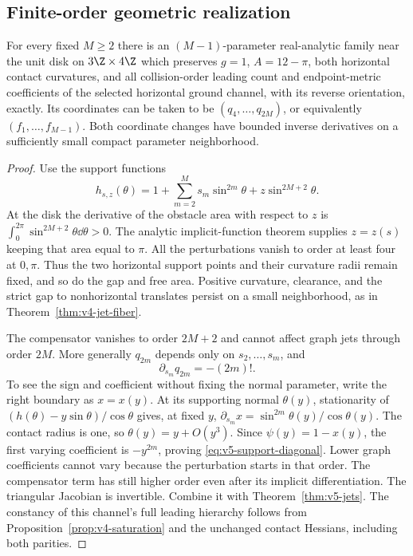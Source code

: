 \subsection{Finite-order geometric realization}
\begin{theorem}
\label{thm:v5-realization}
For every fixed $M\ge2$ there is an $(M-1)$-parameter real-analytic
family near the unit disk on $3\Z\times4\Z$ which preserves
$g=1$, $A=12-\pi$, both horizontal contact curvatures, and all collision-order leading
count and endpoint-metric coefficients of the selected horizontal ground
channel, with its reverse orientation, exactly. Its coordinates can be
taken to be $(q_4,\ldots,q_{2M})$, or equivalently
$(f_1,\ldots,f_{M-1})$. Both coordinate changes have bounded inverse
derivatives on a sufficiently small compact parameter neighborhood.
\end{theorem}
\begin{proof}
Use the support functions
\[
 h_{s,z}(\theta)=1+\sum_{m=2}^M s_m\sin^{2m}\theta
                         +z\sin^{2M+2}\theta.
\]
At the disk the derivative of the obstacle area with respect to $z$ is
$\int_0^{2\pi}\sin^{2M+2}\theta\dd\theta>0$. The analytic implicit-function
theorem supplies $z=z(s)$ keeping that area equal to $\pi$. All the
perturbations vanish to order at least four at $0,\pi$. Thus the two
horizontal support points and their curvature radii remain fixed, and
so do the gap and free area. Positive curvature, clearance, and the
strict gap to nonhorizontal translates persist on a small neighborhood,
as in Theorem~\ref{thm:v4-jet-fiber}.

The compensator vanishes to order $2M+2$ and cannot affect graph jets
through order $2M$. More generally $q_{2m}$ depends only on
$s_2,\ldots,s_m$, and
\begin{equation}\label{eq:v5-support-diagonal}
                 \partial_{s_m}q_{2m}=-(2m)!.
\end{equation}
To see the sign and coefficient without fixing the normal parameter,
write the right boundary as $x=x(y)$. At its supporting normal
$\theta(y)$, stationarity of
$(h(\theta)-y\sin\theta)/\cos\theta$ gives, at fixed $y$,
$\partial_{s_m}x=\sin^{2m}\theta(y)/\cos\theta(y)$.
The contact radius is one, so $\theta(y)=y+O(y^3)$. Since
$\psi(y)=1-x(y)$, the first varying coefficient is $-y^{2m}$,
proving \eqref{eq:v5-support-diagonal}. Lower graph coefficients cannot
vary because the perturbation starts in that order. The compensator
term has still higher order even after its implicit differentiation.
The triangular Jacobian is invertible. Combine it with
Theorem~\ref{thm:v5-jets}. The constancy of this channel's full leading hierarchy follows
from Proposition~\ref{prop:v4-saturation} and the unchanged contact
Hessians, including both parities.
\end{proof}


